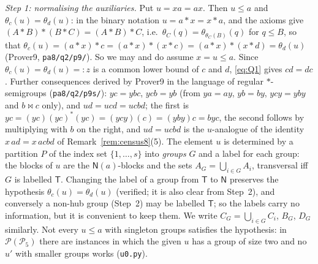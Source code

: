 \documentclass[11pt]{amsart}
\theoremstyle{definition}
\renewcommand{\P}{\mathcal{P}}
\newcommand{\T}{\mathsf{T}}
\newcommand{\N}{\mathsf{N}}
\begin{document}
\smallskip
\emph{Step 1: normalising the auxiliaries.} Put $u=xa=ax$. Then $u\le a$ and $\theta_c(u)=\theta_d(u)$: in the binary notation $u=a*x=x*a$, and the axioms give $(A*B)*(B*C)=(A*B)*C$, i.e.\ $\theta_C(q)=\theta_{\theta_C(B)}(q)$ for $q\le B$, so that $\theta_c(u)=(a*x)*c=(a*x)*(x*c)=(a*x)*(x*d)=\theta_d(u)$ (Prover9, \texttt{pa8/q2/p9/}). So we may and do assume $x=u\le a$. Since $\theta_c(u)=\theta_d(u)=:z$ is a common lower bound of $c$ and $d$, \eqref{eq:Q1} gives $cd=dc$. Further consequences derived by Prover9 in the language of regular $*$-semigroups (\texttt{pa8/q2/p9s/}): $yc=ybc$, $ycb=yb$ (from $ya=ay$, $yb=by$, $ycy=yby$ and $b\bowtie c$ only), and $ud=ucd=ucbd$; the first is $yc=(yc)(yc)^*(yc)=(ycy)(c)=(yby)c=byc$, the second follows by multiplying with $b$ on the right, and $ud=ucbd$ is the $u$-analogue of the identity $x\,ad=x\,acbd$ of Remark~\ref{rem:census8}(5). The element $u$ is determined by a partition $P$ of the index set $\{1,\dots,s\}$ into \emph{groups} $G$ and a label for each group: the blocks of $u$ are the $\N(a)$-blocks and the sets $A_G=\bigcup_{i\in G}A_i$, transversal iff $G$ is labelled $\T$. Changing the label of a group from $\T$ to $\N$ preserves the hypothesis $\theta_c(u)=\theta_d(u)$ (verified; it is also clear from Step~2), and conversely a non-hub group (Step~2) may be labelled $\T$; so the labels carry no information, but it is convenient to keep them. We write $C_G=\bigcup_{i\in G}C_i$, $B_G$, $D_G$ similarly. Not every $u\le a$ with singleton groups satisfies the hypothesis: in $\P(\P_5)$ there are instances in which the given $u$ has a group of size two and no $u'$ with smaller groups works (\texttt{u0.py}).
\end{document}
